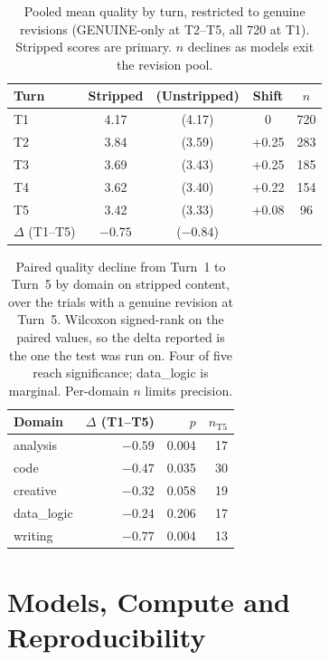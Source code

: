 \begin{table}[t]
    \centering
    \small
    \begin{tabular}{lcccc}
    \toprule
    Turn & Stripped & (Unstripped) & Shift & $n$ \\
    \midrule
    T1 & 4.17 & (4.17) & 0 & 720 \\
    T2 & 3.84 & (3.59) & +0.25 & 283 \\
    T3 & 3.69 & (3.43) & +0.25 & 185 \\
    T4 & 3.62 & (3.40) & +0.22 & 154 \\
    T5 & 3.42 & (3.33) & +0.08 & 96 \\
    \midrule
    $\Delta$ (T1--T5) & $\mathbf{-0.75}$ & ($-0.84$) & & \\
    \bottomrule
    \end{tabular}
    \caption{Pooled mean quality by turn, restricted to genuine revisions (GENUINE-only at T2--T5, all 720 at T1). Stripped scores are primary. $n$ declines as models exit the revision pool.}
    \label{tab:pooled-trajectory}
\end{table}

\begin{table}[t]
    \centering
    \small
    \setlength{\tabcolsep}{4pt}
    \begin{tabular}{lrrr}
    \toprule
    Domain & $\Delta$ (T1--T5) & $p$ & $n_{\text{T5}}$ \\
    \midrule
    analysis & $-0.59$ & 0.004 & 17 \\
    code & $-0.47$ & 0.035 & 30 \\
    creative & $-0.32$ & 0.058 & 19 \\
    data\_logic & $-0.24$ & 0.206 & 17 \\
    writing & $-0.77$ & 0.004 & 13 \\
    \bottomrule
    \end{tabular}
    \caption{Paired quality decline from Turn~1 to Turn~5 by domain on stripped content,
    over the trials with a genuine revision at Turn~5. Wilcoxon signed-rank on the paired
    values, so the delta reported is the one the test was run on. Four of five reach
    significance; data\_logic is marginal. Per-domain $n$ limits precision.}
    \label{tab:domain-variation}
\end{table}


\section{Models, Compute and Reproducibility}
\label{sec:appendix-compute}

